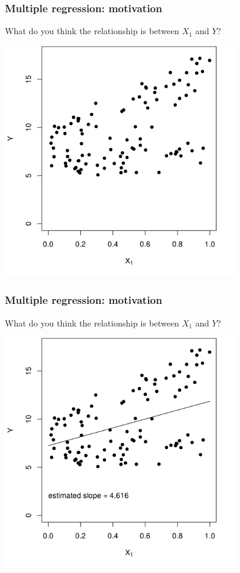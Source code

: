 \documentclass[12pt, 
hyperref={colorlinks=true, linkcolor=blue, urlcolor=cyan}]{beamer}
\begin{document}
\begin{frame}
\frametitle{Multiple regression: motivation}
What do you think the relationship is between $X_1$ and $Y$?

\centering
\includegraphics[width = 0.75\textwidth]{plots/effect_modification_simple.png}
\end{frame}

\begin{frame}
\frametitle{Multiple regression: motivation}
What do you think the relationship is between $X_1$ and $Y$?

\centering
\includegraphics[width = 0.75\textwidth]{plots/effect_modification_simple_with_line.png}
\end{frame}
\end{document}
